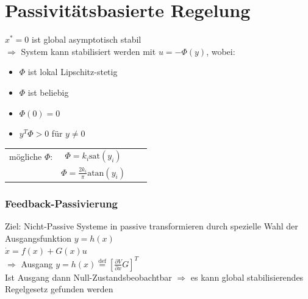\documentclass[german]{latex4ei/latex4ei_sheet}
\begin{document}
\section{Passivitätsbasierte Regelung}
\begin{sectionbox}
$x^* = 0$ ist global asymptotisch stabil\\
$\Rightarrow$ System kann stabilisiert werden mit $u = -\Phi(y)$, wobei:
\begin{itemize}
  \item $\Phi$ ist lokal Lipschitz-stetig
  \item $\Phi$ ist beliebig
  \item $\Phi(0) = 0$
  \item $y^T \Phi > 0$ für $y \neq 0$
\end{itemize}

\begin{tabular}{cccc}
mögliche $\Phi$:  & $\Phi = k_i \text{sat}(y_i)$ & \\
                  & $\Phi = \frac{2 k_i}{\pi}\text{atan}(y_i)$ &
\end{tabular}

\subsubsection{Feedback-Passivierung}
Ziel: Nicht-Passive Systeme in passive transformieren durch spezielle Wahl der Ausgangsfunktion $y=h(x)$ \\
$\dot{x} = f(x) + G(x)u$ \\
$\Rightarrow$ Ausgang $y = h(x) \overset{\text{def}}{=} \left[ \frac{\partial V}{\partial x} G \right]^T$ \\
Ist Ausgang dann Null-Zustandsbeobachtbar $\Rightarrow$ es kann global stabilisierendes Regelgesetz gefunden werden
\end{sectionbox}
\end{document}

